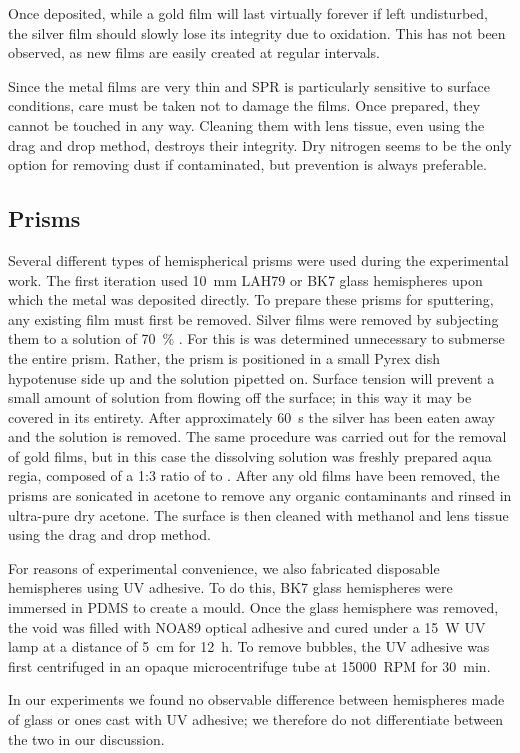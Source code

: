 Once deposited, while a gold film will last virtually forever if left
undisturbed, the silver film should slowly lose its integrity due to
oxidation.  This has not been observed, as new films are easily created at
regular intervals.  

Since the metal films are very thin and SPR is particularly sensitive to
surface conditions, care must be taken not to damage the films.  Once
prepared, they cannot be touched in any way.  Cleaning them with lens
tissue, even using the drag and drop method, destroys their integrity.  Dry
nitrogen seems to be the only option for removing dust if contaminated, but
prevention is always preferable.

\subsection{Prisms}
Several different types of hemispherical prisms were used during the
experimental work.  The first iteration used \SI{10}{\milli\meter} LAH79 or
BK7 glass hemispheres upon which the metal was deposited directly.  To
prepare these prisms for sputtering, any existing film must first be
removed.  Silver films were removed by subjecting them to a solution of
\SI{70}{\percent} .  For this is was determined unnecessary to
submerse the entire prism.  Rather, the prism is positioned in a small
Pyrex dish hypotenuse side up and the  solution pipetted on.
Surface tension will prevent a small amount of solution from flowing off
the surface; in this way it may be covered in its entirety.  After
approximately \SI{60}{\second} the silver has been eaten away and the
solution is removed.  The same procedure was carried out for the removal of
gold films, but in this case the dissolving solution was freshly prepared
aqua regia, composed of a 1:3 ratio of  to .  After any
old films have been removed, the prisms are sonicated in acetone to remove
any organic contaminants and rinsed in ultra-pure dry acetone.  The surface
is then cleaned with methanol and lens tissue using the drag and drop
method.

For reasons of experimental convenience, we also fabricated disposable
hemispheres using UV adhesive.  To do this, BK7 glass hemispheres were
immersed in PDMS to create a mould.  Once the glass hemisphere was removed,
the void was filled with NOA89 optical adhesive and cured under a
\SI{15}{\watt} UV lamp at a distance of \SI{5}{\centi\meter} for
\SI{12}{\hour}.  To remove bubbles, the UV adhesive was first centrifuged
in an opaque microcentrifuge tube at \SI{15000}{RPM} for \SI{30}{\minute}.

In our experiments we found no observable difference between hemispheres
made of glass or ones cast with UV adhesive; we therefore do not
differentiate between the two in our discussion.  
